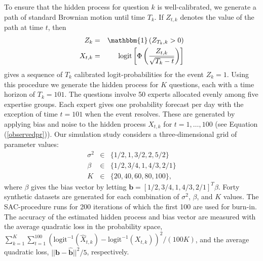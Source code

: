 \documentclass[aoas, preprint]{imsart}
\numberwithin{equation}{section}
\theoremstyle{plain}
\newcommand{\logit}{\text{logit}}
\begin{document}
To ensure that the hidden process for question $k$ is well-calibrated, we generate a path of standard Brownian motion until time $T_k$. If $Z_{t,k}$ denotes the value of the path at time $t$, then
\begin{eqnarray*}
Z_k &=& \mathbbm{1}\left( Z_{T_k, k}  > 0\right)\\
 X_{t,k} &=& \logit \left[ \Phi \left(\frac{Z_{t, k}}{\sqrt{T_k- t}} \right) \right]
\end{eqnarray*}
gives a sequence of $T_k$ calibrated logit-probabilities for the event $Z_k = 1$. Using this procedure we generate the hidden process for $K$ questions, each with a time horizon of $T_k = 101$. The questions involve 50 experts allocated evenly among five expertise groups. Each expert gives one probability forecast per day with the exception of time $t = 101$ when the event resolves. These are generated by applying bias and noise to the hidden process $X_{t,k}$ for $t = 1, \dots, 100$ (see Equation (\ref{observedpr})). Our simulation study considers a three-dimensional grid of parameter values:
\begin{eqnarray*}
\sigma^2 &\in& \{1/2, 1, 3/2, 2, 5/2\}\\
\beta &\in& \{1/2, 3/4, 1, 4/3, 2/1\}\\
K &\in& \{20, 40, 60, 80, 100\},
\end{eqnarray*}
where $\beta$ gives the bias vector by letting $\boldsymbol{b} = [1/2, 3/4, 1, 4/3, 2/1]^T \beta$. Forty synthetic datasets are generated for each combination of $\sigma^2$, $\beta$, and $K$ values. The SAC-procedure runs for 200 iterations of which the first 100 are used for burn-in. The accuracy of the estimated hidden process and bias vector are measured with the average quadratic loss in the probability space, $\sum_{k=1}^K \sum_{t=1}^{100} ( \logit^{-1}(\hat{X}_{t,k}) - \logit^{-1}(X_{t,k}))^2 / (100K)$, and the average quadratic loss, $|| \boldsymbol{b} - \hat{\boldsymbol{b}}||^2/5$, respectively.

\end{document}
